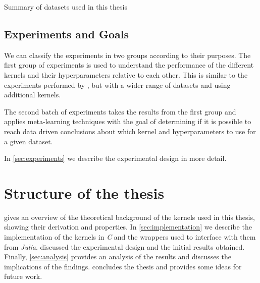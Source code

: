 \begin{table}[H]
    \caption{Summary of datasets used in this thesis}
    \label{tab:datasets}
    
\end{table}

\subsection{Experiments and Goals}%

We can classify the experiments in two groups according to their purposes. The
first group of experiments is used to understand the performance of the
different kernels and their hyperparameters relative to each other. This is
similar to the experiments performed by
\textcite{frenayParameterinsensitiveKernelExtreme2011}, but with a wider range
of datasets and using additional kernels.

The second batch of experiments takes the results from the first group and
applies meta-learning techniques with the goal of determining if it is possible
to reach data driven conclusions about which kernel and hyperparameters to use
for a given dataset.

In \cref{sec:experiments} we describe the experimental design in more detail.



\section{Structure of the thesis}

 gives an overview of the theoretical
background of the kernels used in this thesis, showing their derivation and
properties. In \cref{sec:implementation} we describe the implementation of the
kernels in \emph{C} and the wrappers used to interface with them from
\emph{Julia}.  discussed the experimental design and the
initial results obtained. Finally, \cref{sec:analysis} provides an analysis of
the results and discusses the implications of the findings.
 concludes the thesis and provides some ideas for future
work.

